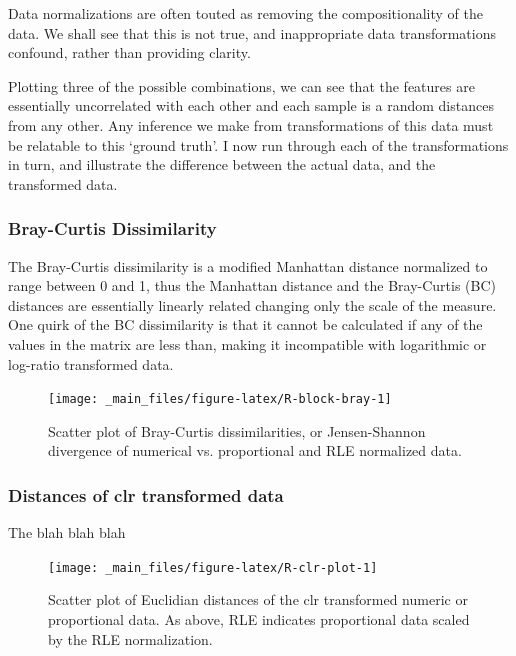 \documentclass[onecolumn]{article}
\begin{document}
Data normalizations are often touted as removing the compositionality of the data. We shall see that this is not true, and inappropriate data transformations confound, rather than providing clarity.

Plotting three of the possible combinations, we can see that the features are essentially uncorrelated with each other and each sample is a random distances from any other. Any inference we make from transformations of this data must be relatable to this `ground truth'. I now run through each of the transformations in turn, and illustrate the difference between the actual data, and the transformed data.

\hypertarget{bray-curtis-dissimilarity}{%
\subsubsection{Bray-Curtis Dissimilarity}\label{bray-curtis-dissimilarity}}

The Bray-Curtis dissimilarity is a modified Manhattan distance normalized to range between 0 and 1, thus the Manhattan distance and the Bray-Curtis (BC) distances are essentially linearly related changing only the scale of the measure. One quirk of the BC dissimilarity is that it cannot be calculated if any of the values in the matrix are less than, making it incompatible with logarithmic or log-ratio transformed data.

\begin{figure}

{\centering \texttt{[image: \_main\_files/figure-latex/R-block-bray-1]} 

}

\caption{Scatter plot of Bray-Curtis dissimilarities, or Jensen-Shannon divergence  of numerical vs. proportional and RLE normalized data.}\label{fig:R-block-bray}
\end{figure}

\hypertarget{distances-of-clr-transformed-data}{%
\subsubsection{Distances of clr transformed data}\label{distances-of-clr-transformed-data}}

The blah blah blah

\begin{figure}

{\centering \texttt{[image: \_main\_files/figure-latex/R-clr-plot-1]} 

}

\caption{Scatter plot of Euclidian distances of the clr transformed numeric or proportional data. As above, RLE indicates proportional data scaled by the RLE normalization.}\label{fig:R-clr-plot}
\end{figure}
\end{document}
